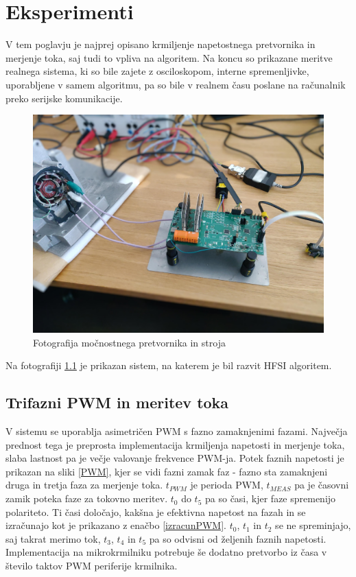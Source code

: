 \documentclass[a4paper,twoside,openright,12pt,slovene]{book}
\begin{document}
\chapter{Eksperimenti}  \label{eksperimenti}

V tem poglavju je najprej opisano krmiljenje napetostnega pretvornika in merjenje toka, saj tudi to vpliva na algoritem. Na koncu so prikazane meritve realnega sistema, ki so bile zajete z
osciloskopom, interne spremenljivke, uporabljene v samem algoritmu, pa so bile v realnem času poslane na računalnik preko serijske komunikacije.

\begin{figure}[!htbp]
    \centering
    \includegraphics[width=0.75\columnwidth]{Slike/EksperimentiSlika.jpg}
    \caption{\label{experimentiSlika} Fotografija močnostnega pretvornika in stroja}
\end{figure}

Na fotografiji \ref{experimentiSlika} je prikazan sistem, na katerem je bil razvit HFSI algoritem. 

\section{Trifazni PWM in meritev toka}

V sistemu se uporablja asimetričen PWM s fazno zamaknjenimi fazami. Največja prednost tega je preprosta implementacija krmiljenja napetosti in merjenje toka, slaba lastnost pa je večje valovanje
frekvence PWM-ja. Potek faznih napetosti je prikazan na sliki \ref{PWM}, kjer se vidi fazni zamak faz - fazno sta zamaknjeni druga in tretja faza za merjenje toka. $t_{PWM}$ je perioda PWM, $t_{MEAS}$
pa je časovni zamik poteka faze za tokovno meritev. $t_0$ do $t_5$ pa so časi, kjer faze spremenijo polariteto. Ti časi določajo, kakšna je efektivna napetost na fazah in se izračunajo kot je
prikazano z enačbo \ref{izracunPWM}. $t_0$, $t_1$ in $t_2$ se ne spreminjajo, saj takrat merimo tok, $t_3$, $t_4$ in $t_5$ pa so odvisni od željenih faznih napetosti. Implementacija na mikrokrmilniku
potrebuje še dodatno pretvorbo iz časa v število taktov PWM periferije krmilnika.
\end{document}
